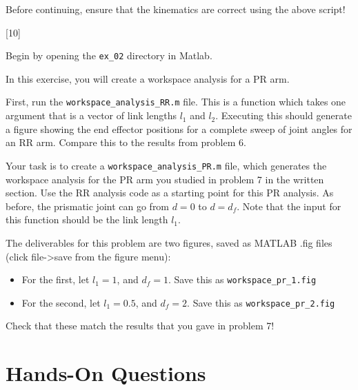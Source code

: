 \documentclass{16384_doc}
\begin{document}
\begin{questions}
    Before continuing, ensure that the kinematics are correct using the above
    script!

    [10]

    Begin by opening the \verb!ex_02! directory in Matlab.

    In this exercise, you will create a workspace analysis for a PR arm.

    First, run the \verb!workspace_analysis_RR.m! file. This is a function which
    takes one argument that is a vector of link lengths $l_1$ and $l_2$.
    Executing this should generate a figure showing the end effector positions
    for a complete sweep of joint angles for an RR arm.  Compare this to the
    results from problem 6.

    Your task is to create a \verb!workspace_analysis_PR.m! file, which generates the workspace
    analysis for the PR arm you studied in problem 7 in the written section. Use the RR analysis
    code as a starting point for this PR analysis. As before, the prismatic joint can go from $d 
    = 0$ to $d = d_f$. Note that the input for this function should be the link length $l_1$.

    The deliverables for this problem are two figures, saved as MATLAB .fig files (click file->save from the figure menu):

    \begin{itemize}
        \item For the first, let $l_1 = 1$, and $d_f = 1$. Save this as
	\verb!workspace_pr_1.fig!
        \item For the second, let $l_1 = 0.5$, and $d_f = 2$. Save this as
	\verb!workspace_pr_2.fig!
    \end{itemize}

    Check that these match the results that you gave in problem 7!

\end{questions}

\section{Hands-On Questions}
\end{document}
